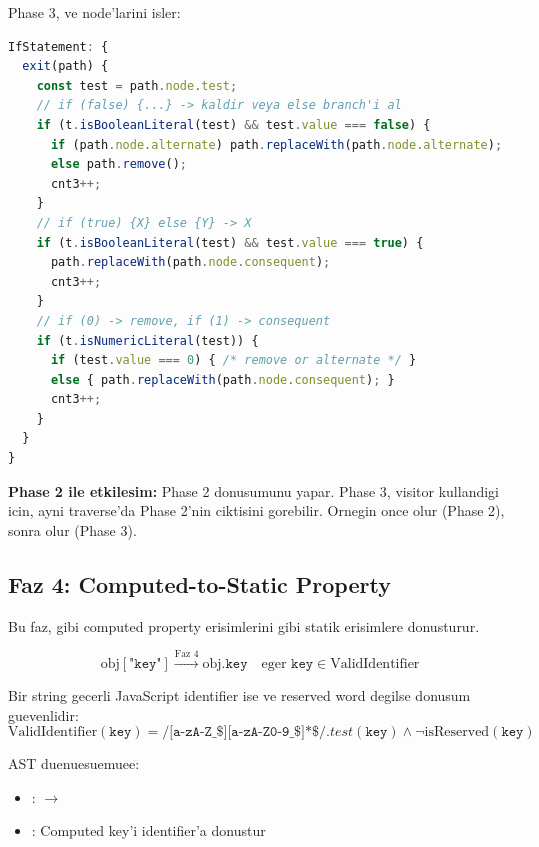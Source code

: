 Phase 3,  ve  node'larini isle\-r:

\begin{lstlisting}[language=JavaScript, caption={Dead code elimination -- IfStatement}]
IfStatement: {
  exit(path) {
    const test = path.node.test;
    // if (false) {...} -> kaldir veya else branch'i al
    if (t.isBooleanLiteral(test) && test.value === false) {
      if (path.node.alternate) path.replaceWith(path.node.alternate);
      else path.remove();
      cnt3++;
    }
    // if (true) {X} else {Y} -> X
    if (t.isBooleanLiteral(test) && test.value === true) {
      path.replaceWith(path.node.consequent);
      cnt3++;
    }
    // if (0) -> remove, if (1) -> consequent
    if (t.isNumericLiteral(test)) {
      if (test.value === 0) { /* remove or alternate */ }
      else { path.replaceWith(path.node.consequent); }
      cnt3++;
    }
  }
}
\end{lstlisting}

\textbf{Phase 2 ile etkilesim:} Phase 2  donusumunu yapar. Phase 3,  visitor kullandigi icin, ayni traverse'da Phase 2'nin ciktisini gorebilir. Ornegin  once  olur (Phase 2), sonra  olur (Phase 3).


\subsection{Faz 4: Computed-to-Static Property}
\label{sec:phase4-cts}

Bu faz,  gibi computed property erisimlerini  gibi statik erisimlere donusturur.

\begin{equation}
\text{obj}[\texttt{"key"}] \xrightarrow{\text{Faz 4}} \text{obj}.\texttt{key}
\quad \text{eger } \texttt{key} \in \text{ValidIdentifier}
\end{equation}

\begin{tanim}
Bir string  gecerli JavaScript identifier ise ve reserved word degilse donusum guevenlidir:
\begin{equation}
\text{ValidIdentifier}(\texttt{key}) = \texttt{/\^{}[a-zA-Z\_\$][a-zA-Z0-9\_\$]*\$/}.test(\texttt{key}) \wedge \neg\text{isReserved}(\texttt{key})
\end{equation}
\end{tanim}

AST duenuesuemuee:
\begin{itemize}
\item {}:  $\to$ 
\item {}: Computed key'i identifier'a donustur
\end{itemize}

